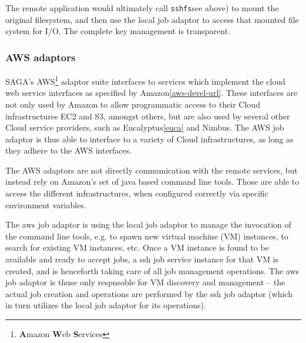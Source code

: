 \documentclass[conference,final]{IEEEtran}
\newcommand{\B}[1]{\textbf{#1}}
\newcommand{\sshfs}[1]{\texttt{sshfs}}
\begin{document}





   The remote application would ultimately call \sshfs (see above) to
   mount the original filesystem, and then use the local job adaptor
   to access that mounted file system for I/O.  The complete key
   management is transparent.

 \subsubsection{AWS adaptors}

 SAGA's AWS\footnote{\B{A}mazon \B{W}eb \B{S}ervices} adaptor suite
 interfaces to services which implement the cloud web service
 interfaces as specified by Amazon\ref{aws-devel-url}.  These
 interfaces are not only used by Amazon to allow programmatic access
 to their Cloud infrastructures EC2 and S3, amongst others, but are
 also used by several other Cloud service providers, such as
 Eucalyptus\ref{euca} and Nimbus.  The AWS job adaptor is thus able to
 interface to a variety of Cloud infrastructures, as long as they
 adhere to the AWS interfaces.

  The AWS adaptors are not directly communication with the remote
  services, but instead rely on Amazon's set of java based command
  line tools.  Those are able to access the different infrastructures,
  when configured correctly via specific environment variables.

  The aws job adaptor is using the local job adaptor to manage the
  invocation of the command line tools, e.g. to spawn new virtual
  machine (VM) instances, to search for existing VM instances, etc.
  Once a VM instance is found to be available and ready to accept
  jobs, a ssh job service instance for that VM is created, and is
  henceforth taking care of all job management operations.  The aws
  job adaptor is thuse only respnsoble for VM discovery and management
  -- the actual job creation and operations are performed by the ssh
  job adaptor (which in turn utilizes the local job adaptor for its
  operations).
\end{document}
